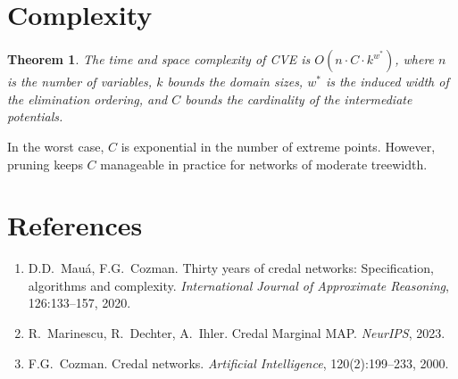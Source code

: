 \documentclass[11pt]{article}
\newtheorem{theorem}{Theorem}
\begin{document}
\section{Complexity}

\begin{theorem}
The time and space complexity of CVE is $O(n \cdot C \cdot k^{w^*})$, where $n$ is
the number of variables, $k$ bounds the domain sizes, $w^*$ is the induced width of the
elimination ordering, and $C$ bounds the cardinality of the intermediate potentials.
\end{theorem}

In the worst case, $C$ is exponential in the number of extreme points. However, pruning
keeps $C$ manageable in practice for networks of moderate treewidth.

\section{References}

\begin{enumerate}
\item D.D.\ Mau\'a, F.G.\ Cozman. Thirty years of credal networks: Specification,
      algorithms and complexity. \emph{International Journal of Approximate Reasoning},
      126:133--157, 2020.
\item R.\ Marinescu, R.\ Dechter, A.\ Ihler. Credal Marginal MAP. \emph{NeurIPS}, 2023.
\item F.G.\ Cozman. Credal networks. \emph{Artificial Intelligence}, 120(2):199--233, 2000.
\end{enumerate}
\end{document}
